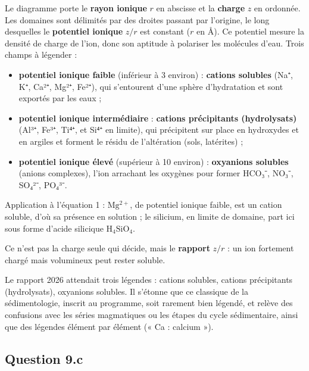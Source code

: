 \documentclass[11pt,a4paper]{article}
\providecommand{\tightlist}{\setlength{\itemsep}{0pt}\setlength{\parskip}{0pt}}
\begin{document}
Le diagramme porte le \textbf{rayon ionique} \(r\) en abscisse et la \textbf{charge} \(z\) en ordonnée. Les domaines sont délimités par des droites passant par l'origine, le long desquelles le \textbf{potentiel ionique} \(z/r\) est constant (\(r\) en Å). Ce potentiel mesure la densité de charge de l'ion, donc son aptitude à polariser les molécules d'eau. Trois champs à légender :

\begin{itemize}
\tightlist
\item
  \textbf{potentiel ionique faible} (inférieur à 3 environ) : \textbf{cations solubles} (Na⁺, K⁺, Ca²⁺, Mg²⁺, Fe²⁺), qui s'entourent d'une sphère d'hydratation et sont exportés par les eaux ;
\item
  \textbf{potentiel ionique intermédiaire} : \textbf{cations précipitants (hydrolysats)} (Al³⁺, Fe³⁺, Ti⁴⁺, et Si⁴⁺ en limite), qui précipitent sur place en hydroxydes et en argiles et forment le résidu de l'altération (sols, latérites) ;
\item
  \textbf{potentiel ionique élevé} (supérieur à 10 environ) : \textbf{oxyanions solubles} (anions complexes), l'ion arrachant les oxygènes pour former HCO₃⁻, NO₃⁻, SO₄²⁻, PO₄³⁻.
\end{itemize}

Application à l'équation 1 : \(\mathrm{Mg^{2+}}\), de potentiel ionique faible, est un cation soluble, d'où sa présence en solution ; le silicium, en limite de domaine, part ici sous forme d'acide silicique \(\mathrm{H_4SiO_4}\).

\begin{piege}

Ce n'est pas la charge seule qui décide, mais le \textbf{rapport} \(z/r\) : un ion fortement chargé mais volumineux peut rester soluble.

\end{piege}

\begin{jury}

Le rapport 2026 attendait trois légendes : cations solubles, cations précipitants (hydrolysats), oxyanions solubles. Il s'étonne que ce classique de la sédimentologie, inscrit au programme, soit rarement bien légendé, et relève des confusions avec les séries magmatiques ou les étapes du cycle sédimentaire, ainsi que des légendes élément par élément (« Ca : calcium »).

\end{jury}

\hypertarget{question-9.c}{%
\subsection{Question 9.c}\label{question-9.c}}
\end{document}
